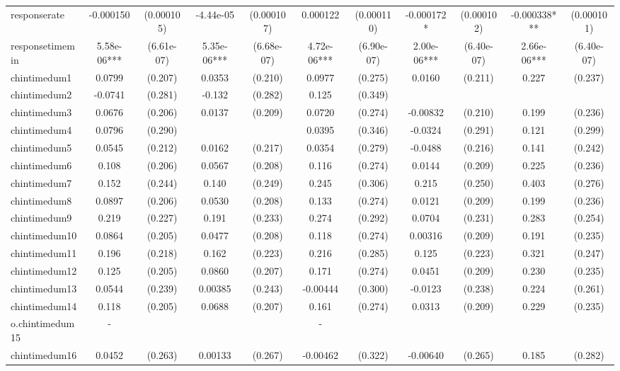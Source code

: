 \documentclass[]{article}
\begin{document}
\begin{tabular}{lcccccccccc}
responserate & -0.000150 & (0.000105) & -4.44e-05 & (0.000107) & 0.000122 & (0.000110) & -0.000172* & (0.000102) & -0.000338*** & (0.000101) \\
responsetimemin & 5.58e-06*** & (6.61e-07) & 5.35e-06*** & (6.68e-07) & 4.72e-06*** & (6.90e-07) & 2.00e-06*** & (6.40e-07) & 2.66e-06*** & (6.40e-07) \\
chintimedum1 & 0.0799 & (0.207) & 0.0353 & (0.210) & 0.0977 & (0.275) & 0.0160 & (0.211) & 0.227 & (0.237) \\
chintimedum2 & -0.0741 & (0.281) & -0.132 & (0.282) & 0.125 & (0.349) &  &  &  &  \\
chintimedum3 & 0.0676 & (0.206) & 0.0137 & (0.209) & 0.0720 & (0.274) & -0.00832 & (0.210) & 0.199 & (0.236) \\
chintimedum4 & 0.0796 & (0.290) &  &  & 0.0395 & (0.346) & -0.0324 & (0.291) & 0.121 & (0.299) \\
chintimedum5 & 0.0545 & (0.212) & 0.0162 & (0.217) & 0.0354 & (0.279) & -0.0488 & (0.216) & 0.141 & (0.242) \\
chintimedum6 & 0.108 & (0.206) & 0.0567 & (0.208) & 0.116 & (0.274) & 0.0144 & (0.209) & 0.225 & (0.236) \\
chintimedum7 & 0.152 & (0.244) & 0.140 & (0.249) & 0.245 & (0.306) & 0.215 & (0.250) & 0.403 & (0.276) \\
chintimedum8 & 0.0897 & (0.206) & 0.0530 & (0.208) & 0.133 & (0.274) & 0.0121 & (0.209) & 0.199 & (0.236) \\
chintimedum9 & 0.219 & (0.227) & 0.191 & (0.233) & 0.274 & (0.292) & 0.0704 & (0.231) & 0.283 & (0.254) \\
chintimedum10 & 0.0864 & (0.205) & 0.0477 & (0.208) & 0.118 & (0.274) & 0.00316 & (0.209) & 0.191 & (0.235) \\
chintimedum11 & 0.196 & (0.218) & 0.162 & (0.223) & 0.216 & (0.285) & 0.125 & (0.223) & 0.321 & (0.247) \\
chintimedum12 & 0.125 & (0.205) & 0.0860 & (0.207) & 0.171 & (0.274) & 0.0451 & (0.209) & 0.230 & (0.235) \\
chintimedum13 & 0.0544 & (0.239) & 0.00385 & (0.243) & -0.00444 & (0.300) & -0.0123 & (0.238) & 0.224 & (0.261) \\
chintimedum14 & 0.118 & (0.205) & 0.0688 & (0.207) & 0.161 & (0.274) & 0.0313 & (0.209) & 0.229 & (0.235) \\
o.chintimedum15 & - &  &  &  & - &  &  &  &  &  \\
chintimedum16 & 0.0452 & (0.263) & 0.00133 & (0.267) & -0.00462 & (0.322) & -0.00640 & (0.265) & 0.185 & (0.282) \\

\end{tabular}
\end{document}
